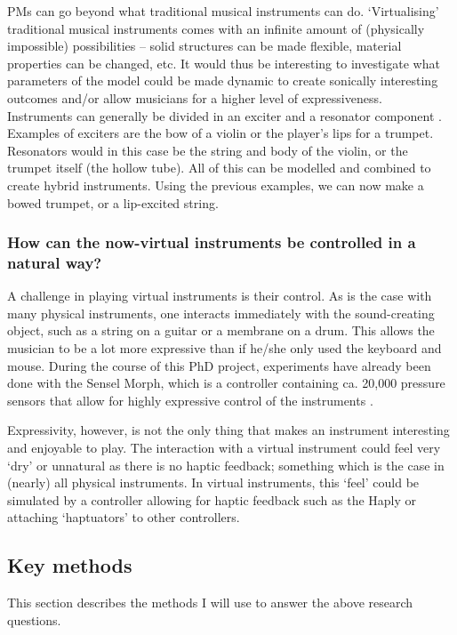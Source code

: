 \noindent PMs can go beyond what traditional musical instruments can do. ‘Virtualising’ traditional musical instruments comes with an infinite amount of (physically impossible) possibilities -- solid structures can be made flexible, material properties can be changed, etc. It would thus be interesting to investigate what parameters of the model could be made dynamic to create sonically interesting outcomes and/or allow musicians for a higher level of expressiveness.
\\

\noindent Instruments can generally be divided in an exciter and a resonator component \cite{Borin1989}. Examples of exciters are the bow of a violin or the player's lips for a trumpet. Resonators would in this case be the string and body of the violin, or the trumpet itself (the hollow tube). All of this can be modelled and combined to create hybrid instruments. Using the previous examples, we can now make a bowed trumpet, or a lip-excited string.

\subsubsection*{How can the now-virtual instruments be controlled in a natural way?}
A challenge in playing virtual instruments is their control. As is the case with many physical instruments, one interacts immediately with the sound-creating object, such as a string on a guitar or a membrane on a drum. This allows the musician to be a lot more expressive than if he/she only used the keyboard and mouse. During the course of this PhD project, experiments have already been done with the Sensel Morph, which is a controller containing ca. 20,000 pressure sensors that allow for highly expressive control of the instruments \cite{Sensel2019}.

Expressivity, however, is not the only thing that makes an instrument interesting and enjoyable to play. The interaction with a virtual instrument could feel very `dry' or unnatural as there is no haptic feedback; something which is the case in (nearly) all physical instruments. In virtual instruments, this `feel' could be simulated by a controller allowing for haptic feedback such as the Haply \cite{Haply2019} or attaching `haptuators' \cite{tactile2019} to other controllers.

\subsection{Key methods}
This section describes the methods I will use to answer the above research questions.

